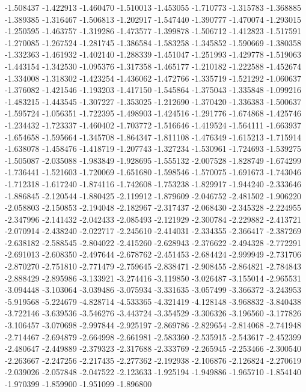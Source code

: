 -1.508437
-1.422913
-1.460470
-1.510013
-1.453055
-1.710773
-1.315783
-1.368885
-1.389385
-1.316467
-1.506813
-1.202917
-1.547440
-1.390777
-1.470074
-1.293015
-1.250595
-1.463757
-1.319286
-1.473577
-1.399878
-1.506712
-1.412823
-1.517591
-1.270085
-1.267524
-1.281745
-1.386584
-1.583258
-1.345852
-1.590669
-1.380358
-1.332363
-1.461932
-1.402140
-1.288339
-1.451047
-1.251993
-1.429778
-1.519063
-1.443154
-1.342530
-1.095376
-1.317358
-1.465177
-1.210182
-1.222588
-1.452674
-1.334008
-1.318302
-1.423254
-1.436062
-1.472766
-1.335719
-1.521292
-1.060637
-1.376082
-1.421546
-1.193203
-1.417150
-1.545864
-1.375043
-1.335848
-1.099216
-1.483215
-1.443545
-1.307227
-1.353025
-1.212690
-1.370420
-1.336383
-1.500637
-1.595724
-1.056351
-1.722395
-1.498903
-1.424516
-1.291776
-1.674868
-1.425746
-1.234432
-1.723337
-1.460402
-1.703772
-1.516646
-1.419524
-1.564111
-1.663937
-1.654658
-1.595664
-1.345708
-1.864347
-1.811108
-1.476349
-1.615213
-1.715914
-1.638078
-1.458476
-1.418719
-1.207743
-1.327234
-1.530961
-1.724693
-1.539275
-1.505087
-2.035088
-1.983849
-1.928695
-1.555132
-2.007528
-1.828749
-1.674299
-1.736441
-1.521603
-1.720069
-1.651680
-1.598546
-1.570075
-1.691673
-1.743046
-1.712318
-1.617240
-1.874116
-1.742608
-1.753238
-1.829917
-1.944240
-2.333646
-1.886845
-2.120544
-1.880425
-2.119912
-1.879609
-2.046752
-2.481502
-1.906220
-2.058803
-2.150853
-2.194048
-2.182967
-2.317437
-2.068430
-2.345328
-2.224955
-2.347996
-2.141432
-2.042433
-2.085493
-2.121929
-2.300784
-2.229882
-2.413721
-2.070914
-2.438240
-2.022717
-2.245610
-2.414031
-2.334355
-2.366417
-2.387269
-2.638182
-2.588545
-2.804022
-2.415260
-2.628943
-2.376622
-2.494328
-2.772291
-2.691013
-2.608350
-2.497644
-2.678762
-2.451453
-2.684424
-2.999949
-2.731706
-2.870270
-2.751810
-2.771479
-2.759645
-2.838471
-2.908455
-2.864821
-2.784843
-2.888429
-2.895986
-3.133921
-3.274416
-3.119850
-3.026487
-3.155014
-2.965531
-3.094448
-3.103064
-3.039486
-3.075934
-3.331635
-3.057499
-3.366372
-3.243953
-5.919568
-5.224679
-4.828714
-4.533365
-4.321419
-4.128148
-3.968832
-3.840438
-3.722146
-3.639536
-3.546276
-3.443724
-3.354529
-3.306326
-3.196560
-3.177826
-3.106457
-3.070698
-2.997844
-2.925197
-2.869786
-2.829654
-2.814068
-2.741948
-2.714467
-2.694879
-2.664998
-2.661981
-2.583360
-2.535915
-2.543617
-2.452399
-2.480647
-2.449889
-2.379323
-2.317688
-2.333769
-2.265945
-2.253466
-2.300540
-2.263667
-2.247256
-2.217435
-2.277362
-2.192938
-2.106876
-2.126824
-2.270619
-2.039026
-2.057848
-2.047522
-2.123633
-1.925194
-1.949886
-1.965710
-1.854140
-1.970399
-1.859900
-1.951099
-1.896800
